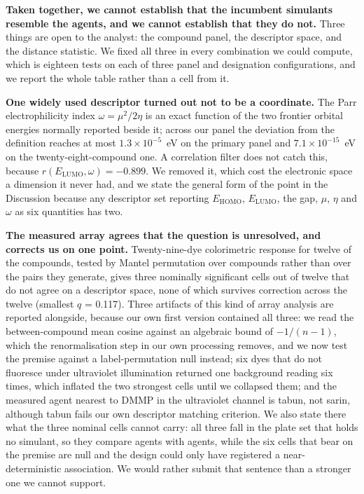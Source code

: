 \documentclass[11pt,a4paper]{article}
\begin{document}
\textbf{Taken together, we cannot establish that the incumbent simulants
resemble the agents, and we cannot establish that they do not.} Three things are
open to the analyst: the compound panel, the descriptor space, and the distance
statistic. We fixed all three in every combination we could compute, which is
eighteen tests on each of three panel and designation configurations, and we
report the whole table rather than a cell from it.

\textbf{One widely used descriptor turned out not to be a coordinate.} The Parr
electrophilicity index $\omega = \mu^{2}/2\eta$ is an exact function of the two
frontier orbital energies normally reported beside it; across our panel the
deviation from the definition reaches at most $1.3\times10^{-5}$~eV on the
primary panel and $7.1\times10^{-15}$~eV on the twenty-eight-compound one. A correlation
filter does not catch this, because $r(E_\mathrm{LUMO}, \omega) = -0.899$. We
removed it, which cost the electronic space a dimension it never had, and we
state the general form of the point in the Discussion because any descriptor set
reporting $E_\mathrm{HOMO}$, $E_\mathrm{LUMO}$, the gap, $\mu$, $\eta$ and
$\omega$ as six quantities has two.

\textbf{The measured array agrees that the question is unresolved, and corrects
us on one point.} Twenty-nine-dye colorimetric response for twelve of the
compounds, tested by Mantel permutation over compounds rather than over the
pairs they generate, gives three nominally significant cells out of twelve that
do not agree on a descriptor space, none of which survives correction across
the twelve (smallest $q$ = 0.117). Three artifacts of this kind of array analysis
are reported alongside, because our own first version contained all three:
we read the between-compound mean cosine against an algebraic bound of
$-1/(n-1)$, which the renormalisation step in our own processing removes, and
we now test the premise against a label-permutation null instead; six dyes that do
not fluoresce under ultraviolet illumination returned one background reading six
times, which inflated the two strongest cells until we collapsed them; and the
measured agent nearest to DMMP in the ultraviolet channel is tabun, not sarin,
although tabun fails our own descriptor matching criterion. We also state
there what the three nominal cells cannot carry: all three fall in the plate
set that holds no simulant, so they compare agents with agents, while the six
cells that bear on the premise are null and the design could only have
registered a near-deterministic association. We would rather submit that
sentence than a stronger one we cannot support.
\end{document}
